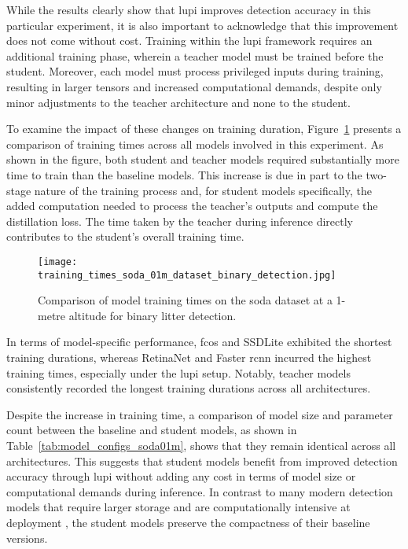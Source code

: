 While the results clearly show that \gls{lupi} improves detection accuracy in this particular experiment, it is also important to acknowledge that this improvement does not come without cost. Training within the \gls{lupi} framework requires an additional training phase, wherein a teacher model must be trained before the student. Moreover, each model must process privileged inputs during training, resulting in larger tensors and increased computational demands, despite only minor adjustments to the teacher architecture and none to the student.

To examine the impact of these changes on training duration, Figure~\ref{fig:soda01m_training_time} presents a comparison of training times across all models involved in this experiment. As shown in the figure, both student and teacher models required substantially more time to train than the baseline models. This increase is due in part to the two-stage nature of the training process and, for student models specifically, the added computation needed to process the teacher’s outputs and compute the distillation loss. The time taken by the teacher during inference directly contributes to the student’s overall training time.

\begin{figure}[!ht]
    \centering
    \texttt{[image: training\_times\_soda\_01m\_dataset\_binary\_detection.jpg]}
    \caption{Comparison of model training times on the \gls{soda} dataset at a 1-metre altitude for binary litter detection.}
    \label{fig:soda01m_training_time}
\end{figure}

In terms of model-specific performance, \gls{fcos} and SSDLite exhibited the shortest training durations, whereas RetinaNet and Faster \gls{rcnn} incurred the highest training times, especially under the \gls{lupi} setup. Notably, teacher models consistently recorded the longest training durations across all architectures.

Despite the increase in training time, a comparison of model size and parameter count between the baseline and student models, as shown in Table~\ref{tab:model_configs_soda01m}, shows that they remain identical across all architectures. This suggests that student models benefit from improved detection accuracy through \gls{lupi} without adding any cost in terms of model size or computational demands during inference. In contrast to many modern detection models that require larger storage and are computationally intensive at deployment \cite{detr, rt-detr, rt-detrv2, rf-detr}, the student models preserve the compactness of their baseline versions.

